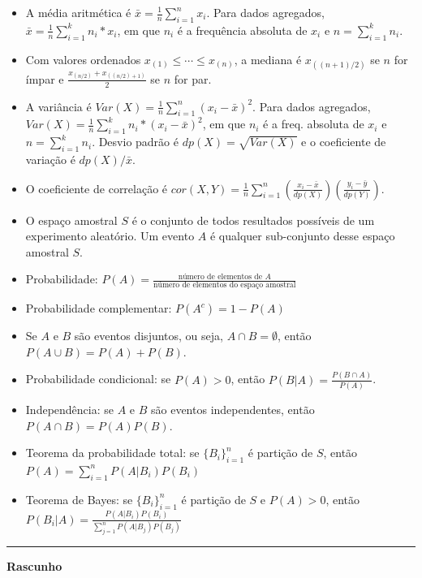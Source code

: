 \documentclass{article}
\begin{document}
\begin{small}
\begin{itemize}
	\item A média aritmética é $\bar{x} = \frac{1}{n} \sum_{i=1}^{n} x_i$. Para dados agregados, $\bar{x} = \frac{1}{n} \sum_{i=1}^{k} n_i * x_i$, em que $n_i$ é a frequência absoluta de $x_i$ e $n=\sum_{i=1}^k n_i$.
	\item Com valores ordenados $x_{(1)} \leq \cdots \leq x_{(n)}$, a mediana é $x_{((n+1)/2)}$ se $n$ for ímpar e $\frac{x_{(n/2)} + x_{((n/2) + 1)}}{2}$ se $n$ for par.
	\item A variância é $Var(X) = \frac{1}{n} \sum_{i=1}^n (x_i - \bar{x})^2$. Para dados agregados, $Var(X) = \frac{1}{n} \sum_{i=1}^k n_i * (x_i - \bar{x})^2$, em que $n_i$ é a freq. absoluta de $x_i$ e $n=\sum_{i=1}^k n_i$. Desvio padrão é $dp(X) = \sqrt{Var(X)}$ e o coeficiente de variação é $dp(X)/\bar{x}$.
	\item O coeficiente de correlação é $cor(X,Y) = \frac{1}{n} \sum_{i=1}^n \left( \frac{x_i - \bar{x}}{dp(X)} \right) \left( \frac{y_i - \bar{y}}{dp(Y)} \right)$.
	
	\item O espaço amostral $S$ é o conjunto de todos resultados possíveis de um experimento aleatório. Um evento $A$ é qualquer sub-conjunto desse espaço amostral $S$.
	\item Probabilidade: $P(A) = \frac{\text{número de elementos de $A$}}{\text{número de elementos do espaço amostral}}$
	\item Probabilidade complementar: $P(A^c) = 1 - P(A)$
	\item Se $A$ e $B$ são eventos disjuntos, ou seja, $A\cap B = \emptyset$, então $P(A \cup B) = P(A) + P(B)$.
	\item Probabilidade condicional: se $P(A)>0$, então $P(B|A) = \frac{P(B \cap A)}{P(A)}$.
	\item Independência: se $A$ e $B$ são eventos independentes, então $P(A \cap B) = P(A) P(B)$.
	\item Teorema da probabilidade total: se $\{B_i\}_{i=1}^n$ é partição de $S$, então $P(A) = \sum_{i=1}^n P(A|B_i) P(B_i)$
	\item Teorema de Bayes: se $\{B_i\}_{i=1}^n$ é partição de $S$ e $P(A)>0$, então $P(B_i | A) = \frac{P(A|B_i) P(B_i)}{\sum_{j=1}^n P(A|B_j) P(B_j)} $
\end{itemize}
\end{small}


\newpage
\begin{center}
	\noindent\rule{15cm}{0.4pt}
	\Large{\textbf{Rascunho}}
\end{center}
\end{document}
